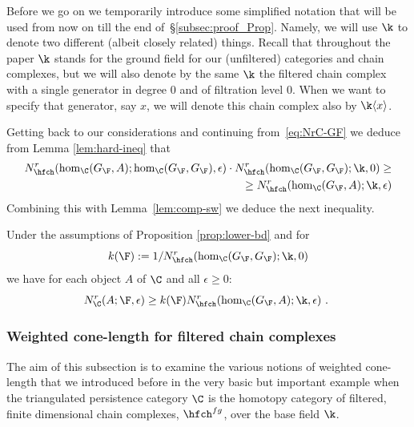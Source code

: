 Before we go on we temporarily introduce some simplified
  notation that will be used from now on till the end
  of~\S\ref{subsec:proof_Prop}. Namely, we will use $\k$ to denote two
  different (albeit closely related) things. Recall that throughout
  the paper $\k$ stands for the ground field for our (unfiltered)
  categories and chain complexes, but we will also denote by the same
  $\k$ the filtered chain complex with a single generator in degree
  $0$ and of filtration level $0$. When we want to specify that
  generator, say $x$, we will denote this chain complex also by
  $\k \langle x \rangle$.

Getting back to our considerations and continuing
  from~\eqref{eq:NrC-GF} we deduce from Lemma \ref{lem:hard-ineq}
  that
\begin{eqnarray*}
  N^{r}_{\hfch}(\hom_{\C}(G_{\F}, A);
  \hom_{\C}(G_{\F},G_{\F}), \epsilon) \cdot
  N^{r}_{\hfch}(\hom_{\C}(G_{\F}, G_{\F});\k,0)\geq \\
  \geq 
  N^{r}_{\hfch}(\hom_{\C}(G_{\F}, A); \k,\epsilon)
\end{eqnarray*}
 Combining
this with Lemma~\ref{lem:comp-sw} we deduce the next inequality.

\begin{cor}\label{cor:nice-ineq} Under the assumptions of Proposition
  \ref{prop:lower-bd} and for
  $$k(\F):=1/ N^{r}_{\hfch}(\hom_{\C}(G_{\F}, G_{\F});\k,0)$$ we have
  for each object $A$ of $\C$ and all $\epsilon\geq 0$:
  $$ N^{r}_{\C}(A;\F,\epsilon) \geq  k(\F)
  N^{r}_{\hfch}(\hom_{\C}(G_{\F}, A); \k,\epsilon)~.~$$
\end{cor}

\subsubsection{Weighted cone-length for filtered chain
  complexes}\label{subsec:pers}
The aim of this subsection is to examine the various notions of
weighted cone-length that we introduced before in the very basic but
important example when the triangulated persistence category $\C$ is
the homotopy category of filtered, finite dimensional chain complexes,
$\hfch^{fg}$, over the base field $\k$.


